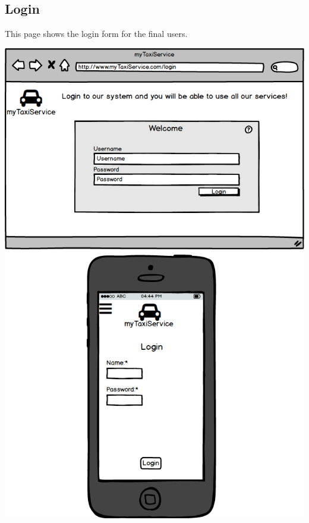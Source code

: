 \documentclass[a4paper,11pt]{report} %
\begin{document}
	\subsection{Login} This page shows the login form for the final users.
	\begin{center}
		\includegraphics[width=0.9\linewidth]{Pictures/Login}
	\end{center}
	\pagebreak
	
	\pagebreak
\end{document}

